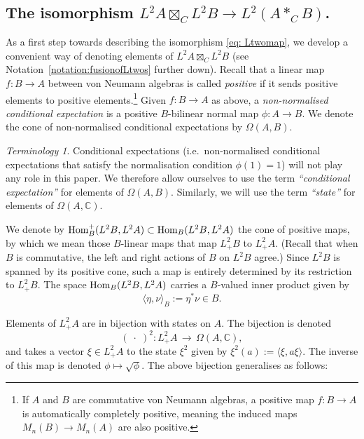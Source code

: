 \documentclass[10pt,a4paper,oneside]{amsart}
\theoremstyle{remark}
\newtheorem*{terminology}{Terminology}
\theoremstyle{definition}
\newcommand{\tn}[1]{\textnormal{#1}}
\newcommand{\Hom}{\textnormal{Hom}}
\newcommand{\rar}{\rightarrow}
\newcommand{\cofu}[1]{\mathop{\boxtimes}_{#1}}
\newcommand{\vn}[1]{{#1}}
\newcommand{\vnmap}{\vn{f}\colon B \rar A}
\newcommand{\homtocond}[1]{#1^2}
\begin{document}
\subsection{The isomorphism $L^2 A \cofu{C} L^2 B\rightarrow L^2(A \ast_{C} B)$.
}\label{sec:condexp}
As a first step towards describing the isomorphism \eqref{eq: Ltwomap},
we develop a convenient way of denoting elements of $ L^2 A \cofu{C} L^2 B$ (see Notation~\ref{notation:fusionofLtwos} further down).
Recall that a linear map $\vnmap$ between von Neumann algebras is called \emph{positive} if it sends positive elements to positive elements.\footnote{If $A$ and $B$ are commutative von Neumann algebras, a positive map $\vnmap$ is automatically completely positive, meaning the induced maps $M_n(B)\to M_n(A)$ are also positive.}
Given $\vnmap$ as above, a \emph{non-normalised conditional expectation} is a positive $B$-bilinear normal map $\phi\colon A \rar B$.
We denote the cone of non-normalised conditional expectations by $\Omega(A,B)$. %

\begin{terminology}
Conditional expectations (i.e.~non-normalised conditional expectations that satisfy the normalisation condition $\phi(1)=1$) will not play any role in this paper. We therefore allow ourselves to use the term \emph{``conditional expectation''} for elements of $\Omega(A,B)$.
Similarly, we will use the term \emph{``state''} for elements of $\Omega(A,\mathbb{C})$. %
\end{terminology}

We denote by $\Hom^\tn{+}_B(L^2B, L^2A) \subset \Hom_B(L^2B, L^2A)$ the cone of positive maps, by which we mean those $B$-linear maps that map $L^2_+B$ to $L^2_+A$.
(Recall that when $B$ is commutative, the left and right actions of $B$ on $L^2B$ agree.)
Since $L^2 B$ is spanned by its positive cone, such a map is entirely determined by its restriction to $L^2_+B$.
The space $\Hom_B(L^2B, L^2A)$ carries a $B$-valued inner product given by
$$
\langle \eta, \nu \rangle_B := \eta^*\nu\in B.
$$

Elements of $L^2_+A$ are in bijection with states on $A$. The bijection is denoted
\begin{equation}\label{eq:posconeposstate}
	\homtocond{(\;\!\cdot \;\!)}:L^2_+A \,\to\, \Omega(A,\mathbb{C}),
\end{equation}
and takes a vector $\xi\in L^2_+A$ to the state $\xi^2$ given by $\homtocond{\xi}(a):=\langle \xi, a \xi\rangle$. The inverse of this map is denoted $\phi\mapsto \sqrt{\phi}$. The above bijection generalises as follows:
\end{document}
